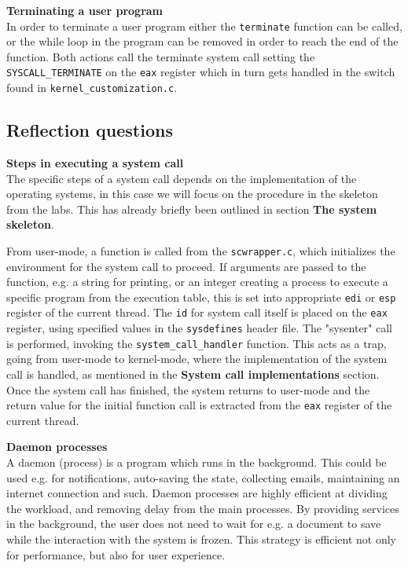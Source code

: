 \textbf{Terminating a user program} \\
In order to terminate a user program either the \texttt{terminate} function can be called, or the while loop in the program can be removed in order to reach the end of the function. Both actions call the terminate system call setting the \texttt{SYSCALL\_TERMINATE} on the \texttt{eax} register which in turn gets handled in the switch found in \texttt{kernel\_customization.c}.

\subsection{Reflection questions}

\textbf{Steps in executing a system call}\\
The specific steps of a system call depends on the implementation of the operating systems, in this case we will focus on the procedure in the skeleton from the labs. This has already briefly been outlined in section \textbf{The system skeleton}.

From user-mode, a function is called from the \texttt{scwrapper.c}, which initializes the environment for the system call to proceed. If arguments are passed to the function, e.g. a string for printing, or an integer creating a process to execute a specific program from the execution table, this is set into appropriate \texttt{edi} or \texttt{esp} register of the current thread. The \texttt{id} for system call itself is placed on the \texttt{eax} register, using specified values in the \texttt{sysdefines} header file. The "sysenter" call is performed, invoking the \texttt{system\_call\_handler} function. This acts as a trap, going from user-mode to kernel-mode, where the implementation of the system call is handled, as mentioned in the \textbf{System call implementations} section. Once the system call has finished, the system returns to user-mode and the return value for the initial function call is extracted from the \texttt{eax} register of the current thread.

\textbf{Daemon processes}\\
A daemon (process) is a program which runs in the background. This could be used e.g. for notifications, auto-saving the state, collecting emails, maintaining an internet connection and such. Daemon processes are highly efficient at dividing the workload, and removing delay from the main processes. By providing services in the background, the user does not need to wait for e.g. a document to save while the interaction with the system is frozen. This strategy is efficient not only for performance, but also for user experience.

